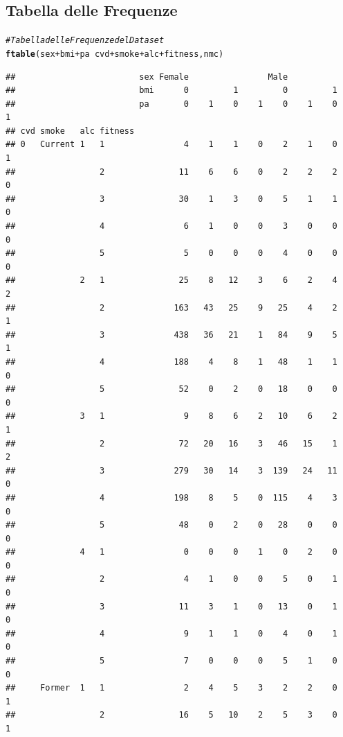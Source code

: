 \documentclass{article}\usepackage[]{graphicx}\usepackage[]{xcolor}
\makeatletter
\newcommand{\hlcom}[1]{\textcolor[rgb]{0.678,0.584,0.686}{\textit{#1}}}%
\newcommand{\hlopt}[1]{\textcolor[rgb]{0,0,0}{#1}}%
\newcommand{\hlstd}[1]{\textcolor[rgb]{0.345,0.345,0.345}{#1}}%
\newcommand{\hlkwd}[1]{\textcolor[rgb]{0.737,0.353,0.396}{\textbf{#1}}}%
\newenvironment{kframe}{%
 \def\at@end@of@kframe{}%
 \ifinner\ifhmode%
  \def\at@end@of@kframe{\end{minipage}}%
  \begin{minipage}{\columnwidth}%
 \fi\fi%
 \def\FrameCommand##1{\hskip\@totalleftmargin \hskip-\fboxsep
 \colorbox{shadecolor}{##1}\hskip-\fboxsep
     \hskip-\linewidth \hskip-\@totalleftmargin \hskip\columnwidth}%
 \MakeFramed {\advance\hsize-\width
   \@totalleftmargin\z@ \linewidth\hsize
   \@setminipage}}%
 {\par\unskip\endMakeFramed%
 \at@end@of@kframe}
\newenvironment{knitrout}{}{} %
\makeatother
\begin{document}
  \subsection{Tabella delle Frequenze}
\begin{knitrout}
\color{fgcolor}\begin{kframe}
\begin{alltt}
\hlcom{#Tabella delle Frequenze del Dataset}
\hlkwd{ftable}\hlstd{(sex}\hlopt{+}\hlstd{bmi}\hlopt{+}\hlstd{pa} \hlopt{~} \hlstd{cvd}\hlopt{+}\hlstd{smoke}\hlopt{+}\hlstd{alc}\hlopt{+}\hlstd{fitness, nmc)}
\end{alltt}
\begin{verbatim}
##                         sex Female                Male               
##                         bmi      0         1         0         1     
##                         pa       0    1    0    1    0    1    0    1
## cvd smoke   alc fitness                                              
## 0   Current 1   1                4    1    1    0    2    1    0    1
##                 2               11    6    6    0    2    2    2    0
##                 3               30    1    3    0    5    1    1    0
##                 4                6    1    0    0    3    0    0    0
##                 5                5    0    0    0    4    0    0    0
##             2   1               25    8   12    3    6    2    4    2
##                 2              163   43   25    9   25    4    2    1
##                 3              438   36   21    1   84    9    5    1
##                 4              188    4    8    1   48    1    1    0
##                 5               52    0    2    0   18    0    0    0
##             3   1                9    8    6    2   10    6    2    1
##                 2               72   20   16    3   46   15    1    2
##                 3              279   30   14    3  139   24   11    0
##                 4              198    8    5    0  115    4    3    0
##                 5               48    0    2    0   28    0    0    0
##             4   1                0    0    0    1    0    2    0    0
##                 2                4    1    0    0    5    0    1    0
##                 3               11    3    1    0   13    0    1    0
##                 4                9    1    1    0    4    0    1    0
##                 5                7    0    0    0    5    1    0    0
##     Former  1   1                2    4    5    3    2    2    0    1
##                 2               16    5   10    2    5    3    0    1

\end{verbatim}
\end{kframe}
\end{knitrout}
\end{document}

